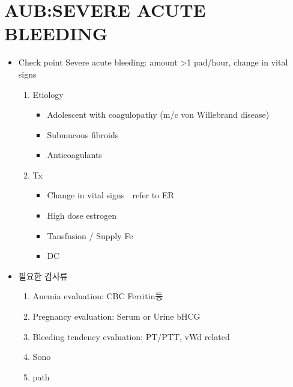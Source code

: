\section{AUB:SEVERE ACUTE BLEEDING}
%
{
\begin{itemize}\tightlist
\item Check point 
Severe acute bleeding: amount >1 pad/hour, change in vital signs 

	\begin{enumerate}\tightlist
	\item Etiology 
		\begin{itemize}\tightlist
		\item  Adolescent with coagulopathy (m/c von Willebrand disease)  
		\item  Submucous fibroids 
		\item  Anticoagulants 
		\end{itemize}
	\item Tx
		\begin{itemize}\tightlist
		\item  Change in vital signs  refer to ER 
		\item  High dose estrogen  
		\item  Tansfusion / Supply Fe
		\item  DC 
		\end{itemize}
	\end{enumerate}	
\item 필요한 검사류
	\begin{enumerate}\tightlist
	\item Anemia evaluation: CBC Ferritin등 
	\item Pregnancy evaluation: Serum or Urine bHCG 
	\item Bleeding tendency evaluation: PT/PTT, vWd related
	\item Sono
	\item path
	\end{enumerate}
\end{itemize}
}